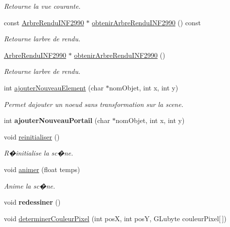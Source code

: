 \begin{DoxyCompactItemize}
\begin{DoxyCompactList}\small\item\em Retourne la vue courante. \end{DoxyCompactList}\item 
const \hyperlink{class_arbre_rendu_i_n_f2990}{Arbre\+Rendu\+I\+N\+F2990} $\ast$ \hyperlink{group__inf2990_ga381a8c1927abe900473fe663a0a9132d}{obtenir\+Arbre\+Rendu\+I\+N\+F2990} () const
\begin{DoxyCompactList}\small\item\em Retourne l\textquotesingle{}arbre de rendu. \end{DoxyCompactList}\item 
\hyperlink{class_arbre_rendu_i_n_f2990}{Arbre\+Rendu\+I\+N\+F2990} $\ast$ \hyperlink{group__inf2990_ga12d5594db6a9507b24c7e1ffcd6751af}{obtenir\+Arbre\+Rendu\+I\+N\+F2990} ()
\begin{DoxyCompactList}\small\item\em Retourne l\textquotesingle{}arbre de rendu. \end{DoxyCompactList}\item 
int \hyperlink{group__inf2990_ga9748abad7e15bbdd3e4f75910bd0ea0e}{ajouter\+Nouveau\+Element} (char $\ast$nom\+Objet, int x, int y)
\begin{DoxyCompactList}\small\item\em Permet d\textquotesingle{}ajouter un noeud sans transformation sur la scene. \end{DoxyCompactList}\item 
int {\bfseries ajouter\+Nouveau\+Portail} (char $\ast$nom\+Objet, int x, int y)
\item 
void \hyperlink{group__inf2990_ga4c2a991fe2297e44eeee0de111fb08d2}{reinitialiser} ()
\begin{DoxyCompactList}\small\item\em R�initialise la sc�ne. \end{DoxyCompactList}\item 
void \hyperlink{group__inf2990_ga24dcb4e32cf104797158b398bafbfbb7}{animer} (float temps)
\begin{DoxyCompactList}\small\item\em Anime la sc�ne. \end{DoxyCompactList}\item 
void {\bfseries redessiner} ()
\item 
void \hyperlink{group__inf2990_ga85f2afcb297fbcaeb3cb96402e440671}{determiner\+Couleur\+Pixel} (int posX, int posY, G\+Lubyte couleur\+Pixel\mbox{[}$\,$\mbox{]})

\end{DoxyCompactItemize}
